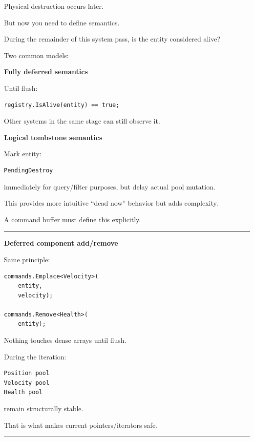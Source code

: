 Physical destruction occurs later.

But now you need to define semantics.

During the remainder of this system pass, is the entity considered alive?

Two common models:

\textbf{Fully deferred semantics}

Until flush:

\begin{verbatim}
registry.IsAlive(entity) == true;
\end{verbatim}

Other systems in the same stage can still observe it.

\textbf{Logical tombstone semantics}

Mark entity:

\begin{verbatim}
PendingDestroy
\end{verbatim}

immediately for query/filter purposes, but delay actual pool mutation.

This provides more intuitive ``dead now'' behavior but adds complexity.

A command buffer must define this explicitly.

\begin{center}\rule{0.5\linewidth}{0.5pt}\end{center}

\textbf{Deferred component add/remove}

Same principle:

\begin{verbatim}
commands.Emplace<Velocity>(
    entity,
    velocity);

commands.Remove<Health>(
    entity);
\end{verbatim}

Nothing touches dense arrays until flush.

During the iteration:

\begin{verbatim}
Position pool
Velocity pool
Health pool
\end{verbatim}

remain structurally stable.

That is what makes current pointers/iterators safe.

\begin{center}\rule{0.5\linewidth}{0.5pt}\end{center}


